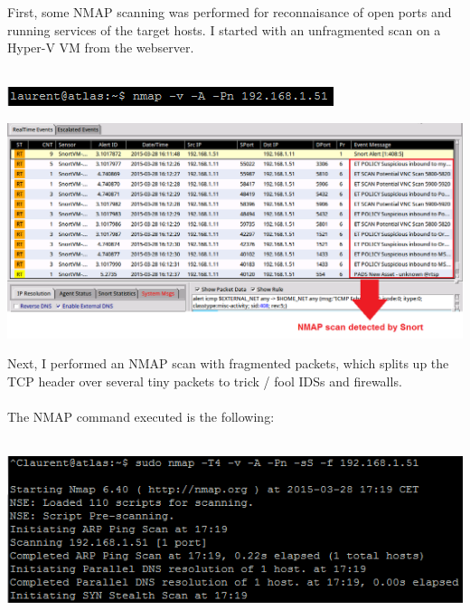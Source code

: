 \documentclass[11pt, a4paper]{article}
\begin{document}
First, some NMAP scanning was performed for reconnaisance of open ports and running services of the target hosts. I started with an unfragmented scan on a Hyper-V VM from the webserver. \\ \\
\noindent\begin{minipage}{\textwidth}
    \centering
    \includegraphics{Ping_Unfragmented_putty.png}
\end{minipage}
\noindent\begin{minipage}{\textwidth}
    \centering
    \includegraphics[width=\textwidth]{Ping_Unfragmented.png}
\end{minipage}
Next, I performed an NMAP scan with fragmented packets, which splits up the TCP header over several tiny packets to trick / fool IDSs and firewalls. \\ \\
The NMAP command executed is the following: \\ \\
\noindent\begin{minipage}{\textwidth}
    \centering
    \includegraphics{Ping_Fragmented_2_putty.png}
\end{minipage}
\end{document}
